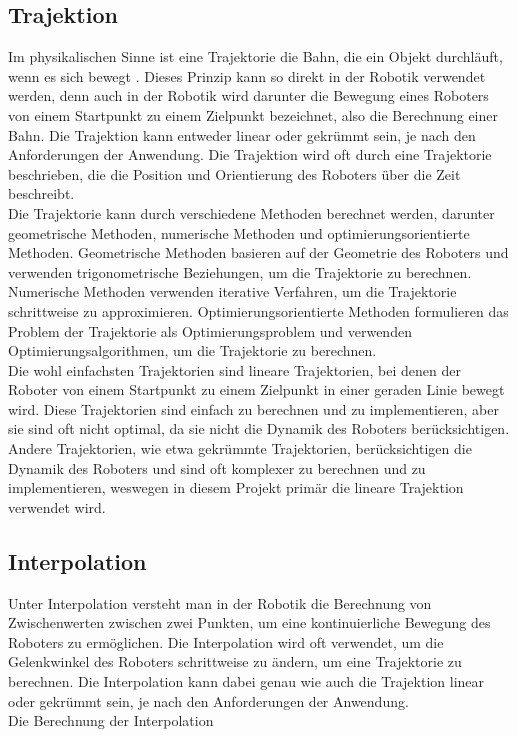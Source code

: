 \subsection{Trajektion}\label{subsec:Trajektion}
Im physikalischen Sinne ist eine Trajektorie die Bahn, die ein Objekt durchläuft, wenn es sich bewegt \cite{wiki-trajektorie}. Dieses Prinzip kann so direkt in der Robotik verwendet werden, denn auch in der Robotik wird darunter die Bewegung eines Roboters von einem Startpunkt zu einem Zielpunkt bezeichnet, also die Berechnung einer Bahn. Die Trajektion kann entweder linear oder gekrümmt sein, je nach den Anforderungen der Anwendung. Die Trajektion wird oft durch eine Trajektorie beschrieben, die die Position und Orientierung des Roboters über die Zeit beschreibt.\\
Die Trajektorie kann durch verschiedene Methoden berechnet werden, darunter geometrische Methoden, numerische Methoden und optimierungsorientierte Methoden. Geometrische Methoden basieren auf der Geometrie des Roboters und verwenden trigonometrische Beziehungen, um die Trajektorie zu berechnen. Numerische Methoden verwenden iterative Verfahren, um die Trajektorie schrittweise zu approximieren. Optimierungsorientierte Methoden formulieren das Problem der Trajektorie als Optimierungsproblem und verwenden Optimierungsalgorithmen, um die Trajektorie zu berechnen.\\
Die wohl einfachsten Trajektorien sind lineare Trajektorien, bei denen der Roboter von einem Startpunkt zu einem Zielpunkt in einer geraden Linie bewegt wird. Diese Trajektorien sind einfach zu berechnen und zu implementieren, aber sie sind oft nicht optimal, da sie nicht die Dynamik des Roboters berücksichtigen. Andere Trajektorien, wie etwa gekrümmte Trajektorien, berücksichtigen die Dynamik des Roboters und sind oft komplexer zu berechnen und zu implementieren, weswegen in diesem Projekt primär die lineare Trajektion verwendet wird.\\

\subsection{Interpolation}\label{subsec:Interpolation}
Unter Interpolation versteht man in der Robotik die Berechnung von Zwischenwerten zwischen zwei Punkten, um eine kontinuierliche Bewegung des Roboters zu ermöglichen. Die Interpolation wird oft verwendet, um die Gelenkwinkel des Roboters schrittweise zu ändern, um eine Trajektorie zu berechnen. Die Interpolation kann dabei genau wie auch die Trajektion linear oder gekrümmt sein, je nach den Anforderungen der Anwendung.\\
Die Berechnung der Interpolation 


